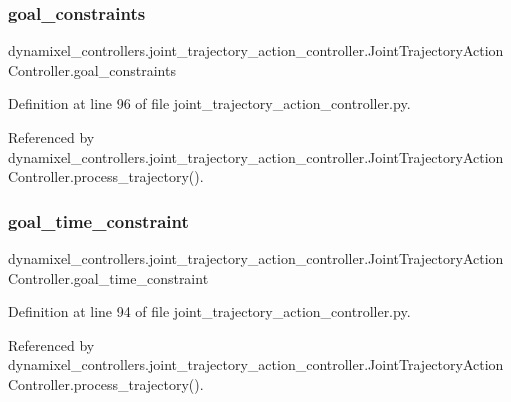 \subsubsection{\texorpdfstring{goal\+\_\+constraints}{goal\_constraints}}
{\footnotesize\ttfamily dynamixel\+\_\+controllers.\+joint\+\_\+trajectory\+\_\+action\+\_\+controller.\+Joint\+Trajectory\+Action\+Controller.\+goal\+\_\+constraints}



Definition at line 96 of file joint\+\_\+trajectory\+\_\+action\+\_\+controller.\+py.



Referenced by dynamixel\+\_\+controllers.\+joint\+\_\+trajectory\+\_\+action\+\_\+controller.\+Joint\+Trajectory\+Action\+Controller.\+process\+\_\+trajectory().

\mbox{\label{classdynamixel__controllers_1_1joint__trajectory__action__controller_1_1_joint_trajectory_action_controller_ad82649e3c1482fcb715d676bbf9e4c74}} 
\subsubsection{\texorpdfstring{goal\+\_\+time\+\_\+constraint}{goal\_time\_constraint}}
{\footnotesize\ttfamily dynamixel\+\_\+controllers.\+joint\+\_\+trajectory\+\_\+action\+\_\+controller.\+Joint\+Trajectory\+Action\+Controller.\+goal\+\_\+time\+\_\+constraint}



Definition at line 94 of file joint\+\_\+trajectory\+\_\+action\+\_\+controller.\+py.



Referenced by dynamixel\+\_\+controllers.\+joint\+\_\+trajectory\+\_\+action\+\_\+controller.\+Joint\+Trajectory\+Action\+Controller.\+process\+\_\+trajectory().


